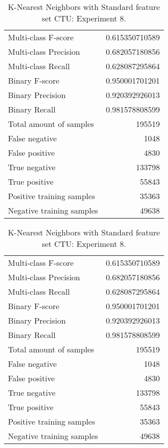 \begin{table}[H]
\begin{minipage}{0.5\textwidth}
\caption{K-Nearest Neighbors with Standard feature set CTU: Experiment 7.}
\centering
\begin{tabular}{l r}
\toprule
Multi-class F-score & 0.615350710589 \\
Multi-class Precision & 0.682057180856 \\
Multi-class Recall & 0.628087295864 \\
\midrule
Binary F-score & 0.950001701201 \\
Binary Precision & 0.920392926013 \\
Binary Recall & 0.981578808599 \\
\midrule
Total amount of samples & 195519 \\
False negative & 1048 \\
False positive & 4830 \\
True negative & 133798 \\
True positive & 55843 \\
\midrule
Positive training samples & 35363 \\
Negative training samples & 49638 \\
\bottomrule
\end{tabular}
\end{minipage}
\hfillx
\begin{minipage}{0.5\textwidth}
\caption{K-Nearest Neighbors with Standard feature set CTU: Experiment 8.}
\centering
\begin{tabular}{l r}
\toprule
Multi-class F-score & 0.615350710589 \\
Multi-class Precision & 0.682057180856 \\
Multi-class Recall & 0.628087295864 \\
\midrule
Binary F-score & 0.950001701201 \\
Binary Precision & 0.920392926013 \\
Binary Recall & 0.981578808599 \\
\midrule
Total amount of samples & 195519 \\
False negative & 1048 \\
False positive & 4830 \\
True negative & 133798 \\
True positive & 55843 \\
\midrule
Positive training samples & 35363 \\
Negative training samples & 49638 \\
\bottomrule
\end{tabular}
\end{minipage}
\end{table}
